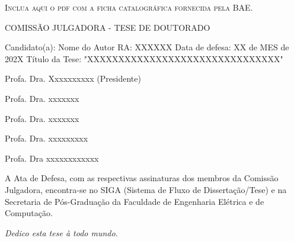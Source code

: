 \documentclass[11pt]{article}
\author{John Doe}
\date{\today}
\title{}
\begin{document}
\tableofcontents

\imprimircapa


\imprimirfolhaderosto*


\begin{fichacatalografica}
    \vspace*{\fill}
    \begin{center}
        \textsc{Inclua aqui o pdf com a ficha catalogr\'{a}fica fornecida pela BAE.}
    \end{center}
    \vspace*{\fill}
\end{fichacatalografica}


\begin{folhadeaprovacao}
  \begin{center}
    COMISS\~{A}O JULGADORA - TESE DE DOUTORADO
\end{center}
\noindent
\begin{minipage}{\textwidth}\SingleSpacing
Candidato(a): Nome do Autor      RA: XXXXXX
Data de defesa: XX de MES de 202X
Título da Tese: "XXXXXXXXXXXXXXXXXXXXXXXXXXXXXXX"
\vspace{2cm}

Profa. Dra. Xxxxxxxxxx (Presidente)

Profa. Dra. xxxxxxx

Profa. Dra. xxxxxxx

Profa. Dra. xxxxxxxxx

Profa. Dra xxxxxxxxxxxx

\vspace{2cm}

A Ata de Defesa, com as respectivas assinaturas dos membros da Comiss\~{a}o Julgadora, encontra-se no SIGA (Sistema de Fluxo de Disserta\c{c}\~{a}o/Tese) e na Secretaria de P\'{o}s-Gradua\c{c}\~{a}o da Faculdade de Engenharia El\'{e}trica e de Computa\c{c}\~{a}o.
\end{minipage}

\end{folhadeaprovacao}


\begin{dedicatoria}
   \vspace*{\fill}
   \centering
   \noindent
   \textit{ Dedico esta tese \`{a} todo mundo.} \vspace*{\fill}
\end{dedicatoria}
\end{document}
